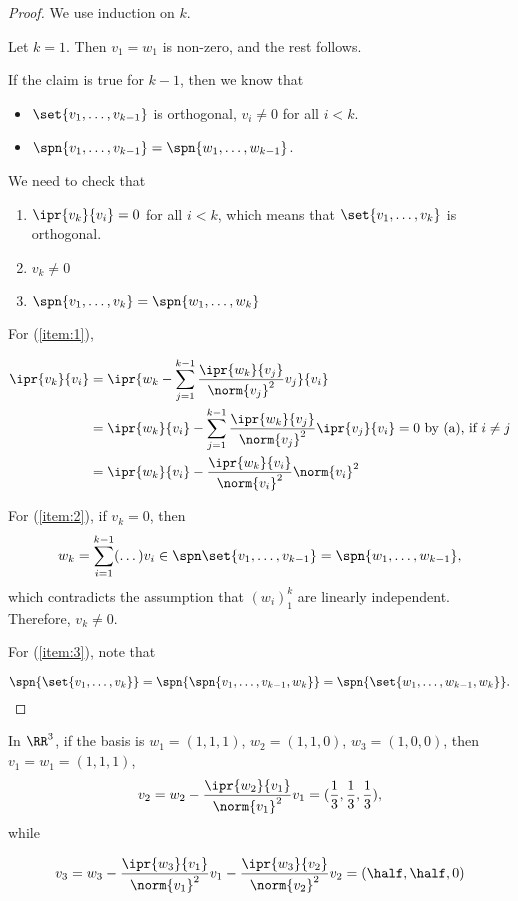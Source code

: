 \documentclass[11pt]{scrartcl}
\begin{document}
\begin{proof}
  We use induction on $k$.

  Let $k=1$. Then $v_1 = w_1$ is non-zero, and the rest follows.

  If the claim is true for $k-1$, then we know that


\begin{itemize}
\item $\set{v_1, \dots, v_{k-1}}$ is orthogonal, $v_{i} \neq 0$ for all $i<k$.
\item $\spn{v_1, \dots, v_{k-1}} = \spn{w_1, \dots, w_{k-1}}$.
\end{itemize}

We need to check that

\begin{enumerate}
\item\label{item:1} $\ipr{v_k}{v_i} = 0$ for all $i< k$, which means
  that $\set{v_1,\dots, v_{k}}$ is orthogonal.
\item\label{item:2} $v_k \neq 0$
\item\label{item:3} $\spn{v_1, \dots, v_k} = \spn{w_1, \dots, w_{k}}$
\end{enumerate}

For (\ref{item:1}),

\begin{align}
  \ipr{v_k}{v_i} & = \ipr{w_k-\sum_{j=1}^{k-1}\frac{\ipr{w_k}{v_j}}{\norm{v_j}^2}v_j}{v_{i}}                                             \\
                 & = \ipr{w_k}{v_i} - \sum_{j=1}^{k-1}\frac{\ipr{w_k}{v_j}}{\norm{v_j}^2}\ipr{v_j}{v_i} = 0\ \text{by (a), if $i\neq j$} \\
                 & = \ipr{w_k}{v_i}-\frac{\ipr{w_k}{v_i}}{\norm{v_i}^2}\norm{v_i}^2
\end{align}

For (\ref{item:2}), if $v_k = 0$, then
\[w_k = \sum_{i=1}^{k-1}(\dots)v_i\in \spn\set{v_1,\dots, v_{k-1}} =
  \spn{w_{1}, \dots, w_{k-1}},\] which contradicts the assumption that
$(w_i)_1^k$ are linearly independent. Therefore, $v_k\neq 0$.

For (\ref{item:3}), note that

\[
  \spn{\set{v_1, \dots, v_k}} = \spn{\spn{v_1, \dots, v_{k-1}, w_{k}}} =\spn{\set{w_1, \dots, w_{k-1}, w_k}}.
  \]
\end{proof}

\begin{example}

  In $\RR^{3}$, if the basis is $w_1 = (1, 1, 1)$, $w_2 = (1, 1, 0)$,
  $w_3 = (1, 0, 0)$, then $v_1 = w_1 = (1, 1, 1) $,
  \[v_2 = w_2 - \frac{\ipr{w_2}{v_1}}{\norm{v_1}^2}v_1 = (\frac{1}{3}, \frac{1}{3}, \frac{1}{3}),\]
  while

  \[
    v_3 = w_3- \frac{\ipr{w_3}{v_1}}{\norm{v_1}^2}v_1 - \frac{\ipr{w_3}{v_2}}{\norm{v_2}^2}v_2 = (\half, \half, 0)
  \]

\end{example}
\end{document}
